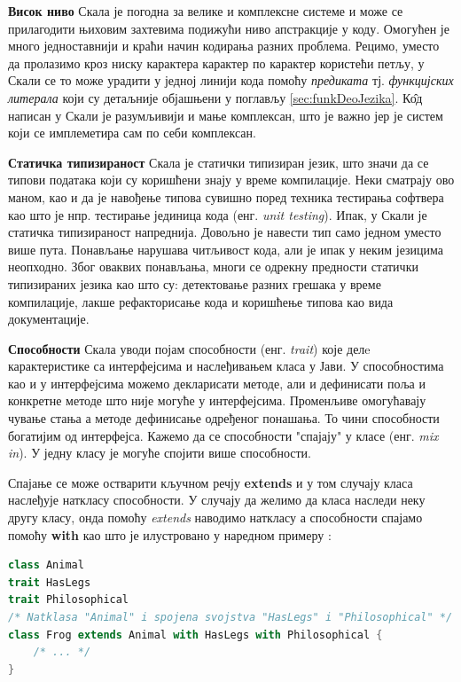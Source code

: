 \documentclass[12pt,oneside]{memoir}
\begin{document}
\begin{description}
\item \textbf{Висок ниво} Скала је погодна за велике и комплексне системе и може се прилагодити њиховим захтевима подижући ниво апстракције у коду. Омогућен је много једноставнији и краћи начин кодирања разних проблема. Рецимо, уместо да пролазимо кроз ниску карактера карактер по карактер користећи петљу, у Скали се то може урадити у једној линији кода помоћу \textit{предиката} тј.  \textit{функцијских литерала} који су детаљније објашњени у поглављу \ref{sec:funkDeoJezika}. К\^{о}д написан у Скали је разумљивији и мање комплексан, што је важно јер је систем који се имплеметира сам по себи комплексан.

\item \textbf{Статичка типизираност} Скала је статички типизиран језик, што значи да се типови података који су коришћени знају у време компилације. Неки сматрају ово маном, као и да је навођење типова сувишно поред техника тестирања софтвера као што је нпр. тестирање јединица кода (енг. \textit{unit testing}). Ипак, у Скали је статичка типизираност напреднија. Довољно је навести тип само једном уместо више пута. Понављање нарушава читљивост кода, али је ипак у неким језицима неопходно. Због оваквих понављања, многи се одрекну предности статички типизираних језика као што су: детектовање разних грешака у време компилације, лакше рефакторисање кода и коришћење типова као вида документације.

\item \textbf{Способности} Скала уводи појам способности (енг. \textit{trait}) које делe карактеристике са интерфејсима и наслеђивањем класа у Јави. У способностима као и у интерфејсима можемо декларисати методе, али и дефинисати поља и конкретне методе што није могуће у интерфејсима. Променљиве омогућавају чување стања а методе дефинисање одређеног понашања. То чини способности богатијим од интерфејса. Кажемо да се способности "спајају" у класе (енг. \textit{mix in}). У једну класу је могуће спојити више способности.

Спајање се може остварити кључном речју \textbf{extends} и у том случају класа наслеђује наткласу способности. У случају да желимо да класа наследи неку другу класу, онда помоћу \textit{extends} наводимо наткласу а способности спајамо помоћу \textbf{with} као што је илустровано у наредном примеру \cite{progInScala}: 

\begin{lstlisting}[language=Scala]
class Animal
trait HasLegs
trait Philosophical
/* Natklasa "Animal" i spojena svojstva "HasLegs" i "Philosophical" */
class Frog extends Animal with HasLegs with Philosophical {
	/* ... */
}
\end{lstlisting}


\end{description}
\end{document}
